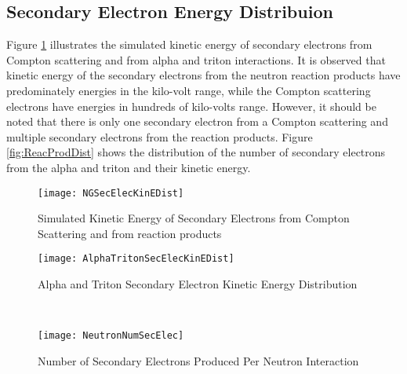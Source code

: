 \subsection{Secondary Electron Energy Distribuion}
Figure \ref{fig:simKinE} illustrates the simulated kinetic energy of secondary electrons from Compton scattering and from alpha and triton interactions.
It is observed that kinetic energy of the secondary electrons from the neutron reaction products have predominately energies in the kilo-volt range, while the Compton scattering electrons have energies in hundreds of kilo-volts range. 
However, it should be noted that there is only one secondary electron from a Compton scattering and multiple secondary electrons from the reaction products.
Figure \ref{fig:ReacProdDist} shows the distribution of the number of secondary electrons from the alpha and triton and their kinetic energy.
\begin{figure}[ht]
    \centering
    \texttt{[image: NGSecElecKinEDist]}
    \caption{Simulated Kinetic Energy of Secondary Electrons from Compton Scattering and from  reaction products}
    \label{fig:simKinE}
\end{figure}
\begin{figure*}[ht]
	\centering
	\begin{subfigure}[b]{0.45\textwidth}
    		\texttt{[image: AlphaTritonSecElecKinEDist]}
		\caption{Alpha and Triton Secondary Electron Kinetic Energy Distribution}
	\end{subfigure}%
	~
	\begin{subfigure}[b]{0.45\textwidth}
    		\texttt{[image: NeutronNumSecElec]}
		\caption{Number of Secondary Electrons Produced Per Neutron Interaction}
	\end{subfigure}%
	\caption{Neutron Reaction Products Secondary Electrons Energies}
	\label{fig:ReacProdDist}
\end{figure*}

